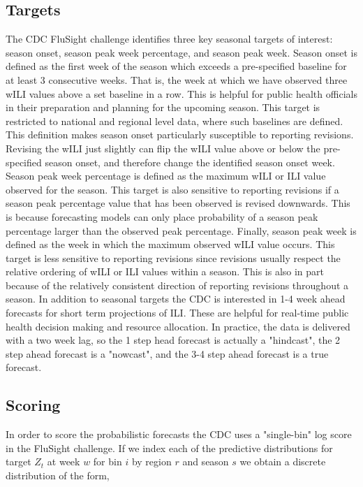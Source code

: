 \documentclass{umassthesis}          %
\begin{document}
\subsection{Targets}

The CDC FluSight challenge identifies three key seasonal targets of interest: season onset, season peak week percentage, and season peak week. Season onset is defined as the first week of the season which exceeds a pre-specified baseline for at least 3 consecutive weeks. That is, the week at which we have observed three wILI  values above a set baseline in a row. This is helpful for public health officials in their preparation and planning for the upcoming season. This target is restricted to national and regional level data, where such baselines are defined. This definition makes season onset particularly susceptible to reporting revisions. Revising the wILI just slightly can flip the wILI value above or below the pre-specified season onset, and therefore change the identified season onset week. Season peak week percentage is defined as the maximum wILI or ILI value observed for the season. This target is also sensitive to reporting revisions if a season peak percentage value that has been observed is revised downwards. This is because forecasting models can only place probability of a season peak percentage larger than the observed peak percentage. Finally, season peak week is defined as the week in which the maximum observed wILI value occurs. This target is less sensitive to reporting revisions since revisions usually respect the relative ordering of wILI or ILI values within a season. This is also in part because of the relatively consistent direction of reporting revisions throughout a season.  
  In addition to seasonal targets the CDC is interested in 1-4 week ahead forecasts for short term projections of ILI. These are helpful for real-time public health decision making and resource allocation. In practice, the data is delivered with a two week lag, so the 1 step head forecast is actually a "hindcast", the 2 step ahead forecast is a "nowcast", and the 3-4 step ahead forecast is a true forecast. 


\subsection{Scoring}

In order to score the probabilistic forecasts the CDC uses a "single-bin" log score in the FluSight challenge. If we index each of the predictive distributions for target $Z_t$ at week $w$ for bin $i$ by region $r$ and season $s$   we obtain a discrete distribution of the form,
\end{document}
